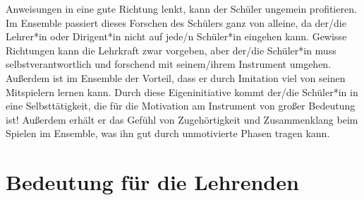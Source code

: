 Anweisungen in eine gute Richtung lenkt, kann der Schüler ungemein profitieren.
Im Ensemble passiert dieses Forschen des Schülers ganz von alleine, da der/die
Lehrer*in oder Dirigent*in nicht auf jede/n Schüler*in eingehen kann. Gewisse Richtungen
kann die Lehrkraft zwar vorgeben, aber der/die Schüler*in muss selbstverantwortlich und
forschend mit seinem/ihrem Instrument umgehen. Außerdem ist im Ensemble der Vorteil,
dass er durch Imitation viel von seinen Mitspielern lernen kann. Durch diese
Eigeninitiative kommt der/die Schüler*in in eine Selbsttätigkeit, die für die
Motivation am Instrument von großer Bedeutung ist! Außerdem erhält er das Gefühl
von Zugehörtigkeit und Zusammenklang beim Spielen im Ensemble, was ihn gut durch
unmotivierte Phasen tragen kann.

\section{Bedeutung für die Lehrenden}

